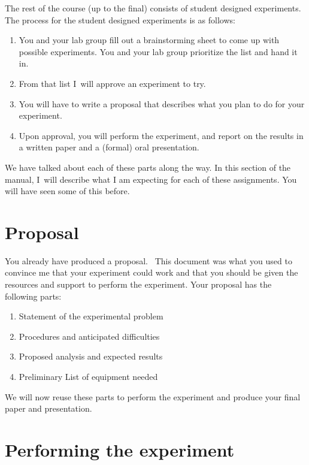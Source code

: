The rest of the course (up to the final) consists of student designed
experiments. The process for the student designed experiments is as follows:

\begin{enumerate}
\item You and your lab group fill out a brainstorming sheet to come up with
possible experiments. You and your lab group prioritize the list and hand it
in.

\item From that list I\ will approve an experiment to try.

\item You will have to write a proposal that describes what you plan to do
for your experiment.

\item Upon approval, you will perform the experiment, and report on the
results in a written paper and a (formal) oral presentation.
\end{enumerate}

We have talked about each of these parts along the way. In this section of
the manual, I\ will describe what I am expecting for each of these
assignments. You will have seen some of this before.

\section{Proposal}

You already have produced a proposal. \ This document was what you used to
convince me that your experiment could work and that you should be given the
resources and support to perform the experiment. Your proposal has the
following parts:

\begin{enumerate}
\item Statement of the experimental problem

\item Procedures and anticipated difficulties

\item Proposed analysis and expected results

\item Preliminary List of equipment needed
\end{enumerate}

We will now reuse these parts to perform the experiment and produce your
final paper and presentation.

\section{Performing the experiment}

